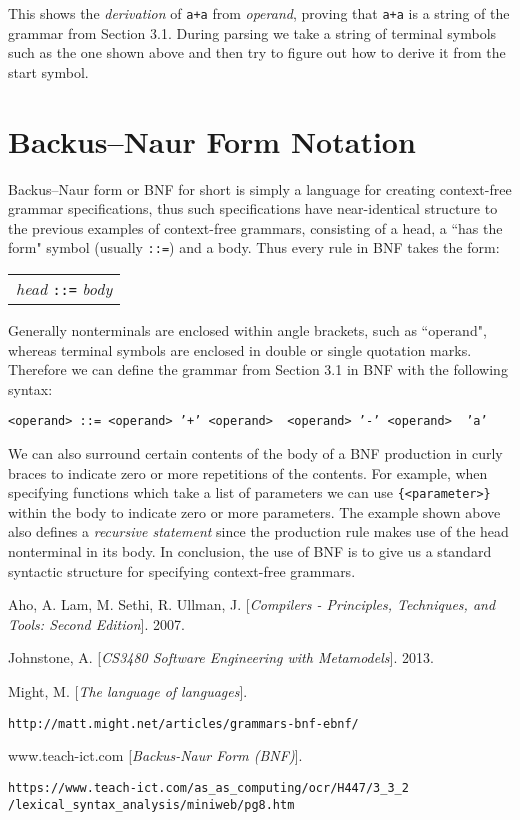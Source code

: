 \documentclass[a4paper, 11pt]{article}
\begin{document}
This shows the \textit{derivation} of \texttt{a+a} from \textit{operand}, proving that \texttt{a+a} is a string of the grammar from Section 3.1. During parsing we take a string of terminal symbols such as the one shown above and then try to figure out how to derive it from the start symbol.

\section{Backus–Naur Form Notation}
Backus–Naur form or BNF for short is simply a language for creating context-free grammar specifications, thus such specifications have near-identical structure to the previous examples of context-free grammars, consisting of a head, a ``has the form" symbol (usually \texttt{::=}) and a body. Thus every rule in BNF takes the form:

\begin{center}
	\begin{tabular}{l}
		\textit{head} \texttt{::=} \textit{body}
	\end{tabular}
\end{center}

Generally nonterminals are enclosed within angle brackets, such as ``\textlangle{}operand\textrangle{}", whereas terminal symbols are enclosed in double or single quotation marks. Therefore we can define the grammar from Section 3.1 in BNF with the following syntax:

\begin{center}
	\texttt{<operand> ::= <operand> '+' <operand> \textbar\ <operand> '-' <operand> \textbar\ 'a'}
\end{center}

We can also surround certain contents of the body of a BNF production in curly braces to indicate zero or more repetitions of the contents. For example, when specifying functions which take a list of parameters we can use \texttt{\{<parameter>\}} within the body to indicate zero or more parameters. The example shown above also defines a \textit{recursive statement} since the production rule makes use of the head nonterminal in its body. In conclusion, the use of BNF is to give us a standard syntactic structure for specifying context-free grammars.

\newpage
{}
\begin{thebibliography}{9}

Aho, A. Lam, M. Sethi, R. Ullman, J.
[\textit{Compilers - Principles, Techniques, and Tools: Second Edition}]. 
2007.

Johnstone, A.
[\textit{CS3480 Software Engineering with Metamodels}]. 
2013.

Might, M.
[\textit{The language of languages}]. 

\texttt{http://matt.might.net/articles/grammars-bnf-ebnf/}

www.teach-ict.com
[\textit{Backus-Naur Form (BNF)}]. 

\texttt{https://www.teach-ict.com/as\_as\_computing/ocr/H447/3\_3\_2
/lexical\_syntax\_analysis/miniweb/pg8.htm}


\end{thebibliography}
\end{document}
